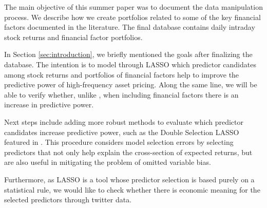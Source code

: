 The main objective of this summer paper was to document the data manipulation process. We describe how we create portfolios related to some of the key financial factors documented in the literature. The final database contains daily intraday stock returns and financial factor portfolios.

In Section \ref{sec:introduction}, we briefly mentioned the goals after finalizing the database. The intention is to model through LASSO which predictor candidates among stock returns and portfolios of financial factors help to improve the predictive power of high-frequency asset pricing. Along the same line, we will be able to verify whether, unlike , when including financial factors there is an increase in predictive power.

Next steps include adding more robust methods to evaluate which predictor candidates increase predictive power, such as the Double Selection LASSO featured in . This procedure considers model selection errors by selecting predictors that not only help explain the cross-section of expected returns, but are also useful in mitigating the problem of omitted variable bias.

Furthermore, as LASSO is a tool whose predictor selection is based purely on a statistical rule, we would like to check whether there is economic meaning for the selected predictors through twitter data.




%
%
%
%
